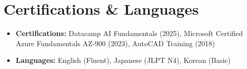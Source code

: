\documentclass[letterpaper,11pt]{article}
\newcommand{\resumeSubHeadingListStart}{\begin{itemize}[leftmargin=*]}
\newcommand{\resumeSubHeadingListEnd}{\end{itemize}}
\begin{document}
\section{Certifications \& Languages}
  \resumeSubHeadingListStart
    \item{
      \textbf{Certifications: } Datacamp AI Fundamentals (2025), Microsoft Certified Azure Fundamentals AZ-900 (2023), AutoCAD Training (2018)
    }
    \item{
      \textbf{Languages: } English (Fluent), Japanese (JLPT N4), Korean (Basic)
    }
  \resumeSubHeadingListEnd
\end{document}
